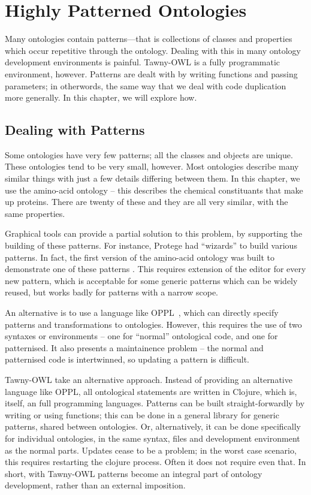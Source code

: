 \chapter{Highly Patterned Ontologies}
\label{cha:highly-patt-ontol}

Many ontologies contain patterns---that is collections of classes and
properties which occur repetitive through the ontology. Dealing with this in
many ontology development environments is painful. Tawny-OWL is a fully
programmatic environment, however. Patterns are dealt with by writing
functions and passing parameters; in otherwords, the same way that we deal
with code duplication more generally. In this chapter, we will explore how.


\section{Dealing with Patterns}
\label{sec:deal-with-patt}

Some ontologies have very few patterns; all the classes and objects are
unique. These ontologies tend to be very small, however. Most ontologies
describe many similar things with just a few details differing between them.
In this chapter, we use the amino-acid ontology -- this describes the chemical
constituants that make up proteins. There are twenty of these and they are all
very similar, with the same properties.

Graphical tools can provide a partial solution to this problem, by supporting
the building of these patterns. For instance, Protege had ``wizards'' to build
various patterns. In fact, the first version of the amino-acid ontology was
built to demonstrate one of these patterns \cite{todo}. This requires
extension of the editor for every new pattern, which is acceptable for some
generic patterns which can be widely reused, but works badly for patterns with
a narrow scope.

An alternative is to use a language like
OPPL~\cite{aranguren_Stevens_Antezana_2009}, which can directly specify
patterns and transformations to ontologies. However, this requires the use of
two syntaxes or environments -- one for ``normal'' ontological code, and one
for patternised. It also presents a maintainence problem -- the normal and
patternised code is intertwinned, so updating a pattern is difficult.

Tawny-OWL take an alternative approach. Instead of providing an alternative
language like OPPL, all ontological statements are written in Clojure, which
is, itself, an full programming languages. Patterns can be built
straight-forwardly by writing or using functions; this can be done in a
general library for generic patterns, shared between ontologies. Or,
alternatively, it can be done specifically for individual ontologies, in the
same syntax, files and development environment as the normal parts. Updates
cease to be a problem; in the worst case scenario, this requires restarting
the clojure process. Often it does not require even that. In short, with
Tawny-OWL patterns become an integral part of ontology development, rather
than an external imposition.

